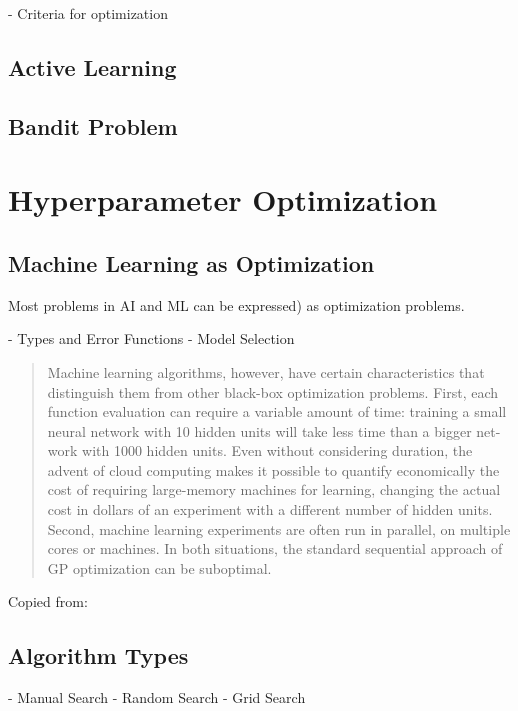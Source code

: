 \documentclass[english]{article}
\begin{document}
\begin{definition}[Topology]

 - Criteria for optimization



\subsection{Active Learning}


\subsection{Bandit Problem}



\section{Hyperparameter Optimization}

\subsection{Machine Learning as Optimization}

Most problems in \ac{AI} and \ac{ML} can be expressed) as
optimization problems.

 - Types and Error Functions
 - Model Selection

\begin{quote}
Machine learning algorithms, however, have certain characteristics that distinguish them from other black-box optimization problems.  First, each function evaluation can require a variable amount of time:  training a small neural network with 10 hidden units will take less time than a bigger net-work with 1000 hidden units.  Even without considering duration, the advent of cloud computing makes it possible to quantify economically the cost of requiring large-memory machines for learning, changing the actual cost in dollars of an experiment with a different number of hidden units.
Second, machine learning experiments are often run in parallel, on multiple cores or machines. In both situations, the standard sequential approach of GP optimization can be suboptimal.
\end{quote}
Copied from: \cite{snoek_practical_2012}

\subsection{Algorithm Types}
 - Manual Search
 - Random Search
 - Grid Search

\end{definition}
\end{document}
